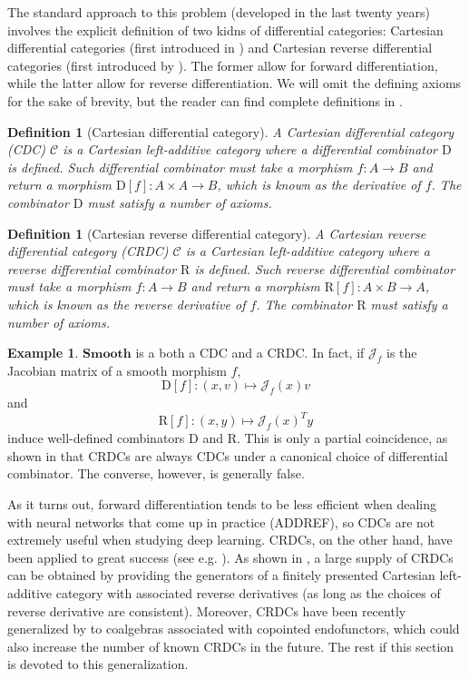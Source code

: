 \documentclass[11pt,a4paper,openright,twoside]{report}
\theoremstyle{plain}
\newtheorem{definition}[proposition]{Definition}
\theoremstyle{definition}
\newtheorem{example}[proposition]{Example}
\begin{document}
The standard approach to this problem (developed in the last twenty years) involves the explicit definition of two kidns of differential categories: Cartesian differential categories (first introduced in \cite{blute2006differential}) and Cartesian reverse differential categories (first introduced by \cite{cockett2019reverse}). The former allow for forward differentiation, while the latter allow for reverse differentiation. We will omit the defining axioms for the sake of brevity, but the reader can find complete definitions in \cite{cockett2019reverse}.

\begin{definition}[Cartesian differential category]
  \label{def: cdc}
  A Cartesian differential category (CDC) $\mathcal{C}$ is a Cartesian left-additive category where a differential combinator $\mathrm{D}$ is defined. Such differential combinator must take a morphism $f: A \to B$ and return a morphism $\mathrm{D}[f]: A \times A \to B$, which is known as the derivative of $f$. The combinator $\mathrm{D}$ must satisfy a number of axioms. 
\end{definition}

\begin{definition}[Cartesian reverse differential category]
  A Cartesian reverse differential category (CRDC) $\mathcal{C}$ is a Cartesian left-additive category where a reverse differential combinator $\mathrm{R}$ is defined. Such reverse differential combinator must take a morphism $f: A \to B$ and return a morphism $\mathrm{R}[f]: A \times B \to A$, which is known as the reverse derivative of $f$. The combinator $\mathrm{R}$ must satisfy a number of axioms. 
\end{definition}

\begin{example}
  \label{ex: smooth}
  $\mathbf{Smooth}$ is a both a CDC and a CRDC. In fact, if $\mathcal{J}_f$ is the Jacobian matrix of a smooth morphism $f$,
  \[\mathrm{D}[f]: (x,v) \mapsto \mathcal{J}_f(x)v\]
  and
  \[\mathrm{R}[f]: (x,y) \mapsto \mathcal{J}_f(x)^Ty\]
  induce well-defined combinators $\mathrm{D}$ and $\mathrm{R}$. This is only a partial coincidence, as shown in \cite{cockett2019reverse} that CRDCs are always CDCs under a canonical choice of differential combinator. The converse, however, is generally false.
\end{example}


As it turns out, forward differentiation tends to be less efficient when dealing with neural networks that come up in practice (ADDREF), so CDCs are not extremely useful when studying deep learning. CRDCs, on the other hand, have been applied to great success (see e.g. \cite{cruttwell2022categorical}). As shown in \cite{wilson2022categories}, a large supply of CRDCs can be obtained by providing the generators of a finitely presented Cartesian left-additive category with associated reverse derivatives (as long as the choices of reverse derivative are consistent).
Moreover, CRDCs have been recently generalized by \cite{gavranovic2024fundamental} to coalgebras associated with copointed endofunctors, which could also increase the number of known CRDCs in the future. The rest if this section is devoted to this generalization.
\end{document}
